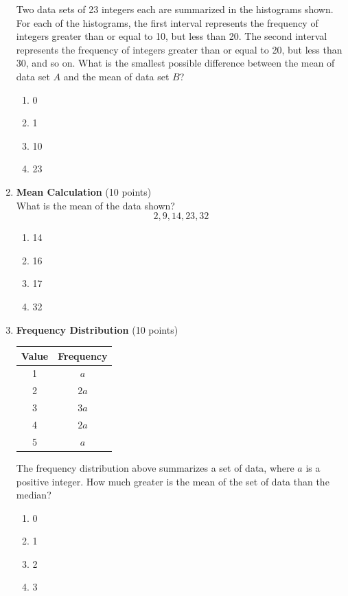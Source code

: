 \begin{enumerate}
  Two data sets of 23 integers each are summarized in the histograms shown. For each of the histograms, the first interval represents the frequency of integers greater than or equal to 10, but less than 20. The second interval represents the frequency of integers greater than or equal to 20, but less than 30, and so on. What is the smallest possible difference between the mean of data set $A$ and the mean of data set $B$?
  \begin{enumerate}[label=(\Alph*)]
    \item 0
    \item 1
    \item 10
    \item 23
  \end{enumerate}
  \begin{subanswer}
  \end{subanswer}

  \item \textbf{Mean Calculation} (10 points)\\
  What is the mean of the data shown?\\
  $$2,9,14,23,32$$
  \begin{enumerate}[label=(\Alph*)]
    \item 14
    \item 16
    \item 17
    \item 32
  \end{enumerate}
  \begin{subanswer}
  \end{subanswer}

  \newpage

  \item \textbf{Frequency Distribution} (10 points)\\
  \begin{center}
  \begin{tabular}{|c|c|}
  \hline
  Value & Frequency \\
  \hline
  1 & $a$ \\
  \hline
  2 & $2a$ \\
  \hline
  3 & $3a$ \\
  \hline
  4 & $2a$ \\
  \hline
  5 & $a$ \\
  \hline
  \end{tabular}
  \end{center}

  The frequency distribution above summarizes a set of data, where $a$ is a positive integer. How much greater is the mean of the set of data than the median?
  \begin{enumerate}[label=(\Alph*)]
    \item 0
    \item 1
    \item 2
    \item 3
  \end{enumerate}
  \begin{subanswer}
  \end{subanswer}


\end{enumerate}
